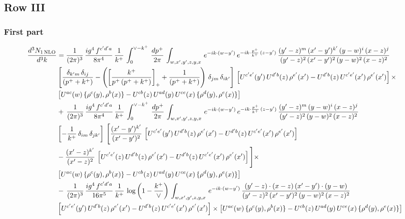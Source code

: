 \documentclass[9pt]{article}
\numberwithin{equation}{section}
\begin{document}
 \subsection{Row III}
\subsubsection{First part}
\begin{align}
     \frac{d^{3}N_{1\,\rm NLO}}{d^{3}k} & =  \frac{1}{(2\pi)^{3}}\, \frac{ig^{4}\,f^{c'd'a}}{8\pi^{4}}\, \frac{1}{k^{+}}\,\int_{0}^{\vee-k^{+}}\,  \frac{dp^{+}}{2\pi}\, \int_{w,x',y',z,y,x}\, e^{-ik\cdot (w-y')}\, e^{-ik\cdot \frac{p^{+}}{k^{+}}\,(z-y')}\,\frac{(y'-z)^{m}\,(x'-y')^{k'}\,(y-w)^{i}\,(x-z)^{j}}{(y'-z)^{2}\,(x'-y')^{2}\,(y-w)^{2}\,(x-z)^{2}}\notag \\ & \left[\frac{\delta_{k'm}\,\delta_{ij}}{(p^{+}+k^{+})}-\left(\left[\frac{k^{+}}{p^{+}\,(p^{+}+k^{+})}\right]_{+}+\frac{1}{(p^{+}+k^{+})}\right)\,\delta_{jm}\,\delta_{ik'}\right]\, \left[U^{c'e'}(y')\,U^{d'b}(z)\,\rho^{e'}(x')-U^{d'b}(z)\,U^{c'e'}(x')\,\rho^{e'}(x')\right]\times\notag \\ &  \left[U^{ac}(w)\, \{\rho^{c}(y),\rho^{b}(x)\}-U^{cb}(z)\,U^{ad}(y)\,U^{ce}(x)\,\{\rho^{d}(y),\rho^{e}(x)\}\right] \notag \\
&  +\,\frac{1}{(2\pi)^{3}}\, \frac{ig^{4}\,f^{c'd'a}}{8\pi^{4}}\, \frac{1}{k^{+}}\,\int_{0}^{\vee-k^{+}}\,  \frac{dp^{+}}{2\pi}\, \int_{w,x',y',z,y,x}\, e^{-ik\cdot (w-y')}\, e^{-ik\cdot \frac{p^{+}}{k^{+}}\,(z-y')}\,\frac{(y'-z)^{m}\,(y-w)^{i}\,(x-z)^{j}}{(y'-z)^{2}\,(y-w)^{2}\,(x-z)^{2}}\notag \\ &   \left[-\frac{1}{k^{+}}\, \delta_{im}\, \delta_{jk'}\right]\, \Bigg[\frac{(x'-y')^{k'}}{(x'-y')^{2}}\,\left[U^{c'e'}(y')\,U^{d'b}(z)\,\rho^{e'}(x')-U^{d'b}(z)\,U^{c'e'}(x')\,\rho^{e'}(x')\right]\notag \\ & -\frac{(x'-z)^{k'}}{(x'-z)^{2}}\,\left[U^{c'e'}(z)\,U^{d'b}(z)\,\rho^{e'}(x')-U^{d'b}(z)\,U^{c'e'}(x')\,\rho^{e'}(x')\right]\Bigg]\times\notag \\ &   \left[U^{ac}(w)\, \{\rho^{c}(y),\rho^{b}(x)\}-U^{cb}(z)\,U^{ad}(y)\,U^{ce}(x)\,\{\rho^{d}(y),\rho^{e}(x)\}\right] \notag \\
& -\,\frac{1}{(2\pi)^{3}}\, \frac{ig^{4}\,f^{c'd'a}}{16\pi^{5}}\, \frac{1}{k^{+}}\,\log{\left(1-\frac{k^{+}}{\vee}\right)}\, \int_{w,x',y',z,y,x}\, e^{-ik\cdot (w-y')}\,\frac{(y'-z)\cdot (x-z)\,(x'-y')\cdot (y-w)}{(y'-z)^{2}\,(x'-y')^{2}\,(y-w)^{2}\,(x-z)^{2}}\notag \\ &  \left[U^{c'e'}(y')\,U^{d'b}(z)\,\rho^{e'}(x')-U^{d'b}(z)\,U^{c'e'}(x')\,\rho^{e'}(x')\right]\times  \left[U^{ac}(w)\, \{\rho^{c}(y),\rho^{b}(x)\}-U^{cb}(z)\,U^{ad}(y)\,U^{ce}(x)\,\{\rho^{d}(y),\rho^{e}(x)\}\right]
\end{align}
\end{document}
